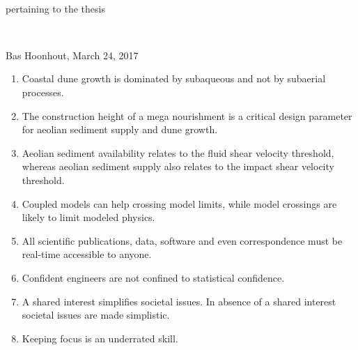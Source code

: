 \documentclass[headinclude,footinclude,cleardoublepage=empty,
numbers=noenddot,fontsize=9pt]{scrbook}
\begin{document}
\pagestyle{plain}

\begin{titlepage}
  \thispagestyle{empty}

  \begin{center}
    \hfill
    \vfill
    
    \begingroup
    \color{Maroon} \\ \bigskip
    \endgroup

    pertaining to the thesis \\ \bigskip

    \begingroup
    \color{Maroon} \\ \bigskip
    \endgroup
    
    Bas Hoonhout, March 24, 2017
  \end{center}  

  \vfill
    
  \begin{enumerate}

  \item Coastal dune growth is dominated by subaqueous and not by
    subaerial processes.

  \item The construction height of a mega nourishment is a critical
    design parameter for aeolian sediment supply and dune growth.

  \item Aeolian sediment availability relates to the fluid shear
    velocity threshold, whereas aeolian sediment supply also relates
    to the impact shear velocity threshold.

  \item Coupled models can help crossing model limits, while model
    crossings are likely to limit modeled physics.

  \item All scientific publications, data, software and even
    correspondence must be real-time accessible to anyone.

  \item Confident engineers are not confined to statistical
    confidence.

  \item A shared interest simplifies societal issues. In absence of a
    shared interest societal issues are made simplistic.
     
  \item Keeping focus is an underrated skill.


\end{enumerate}
\end{titlepage}
\end{document}
